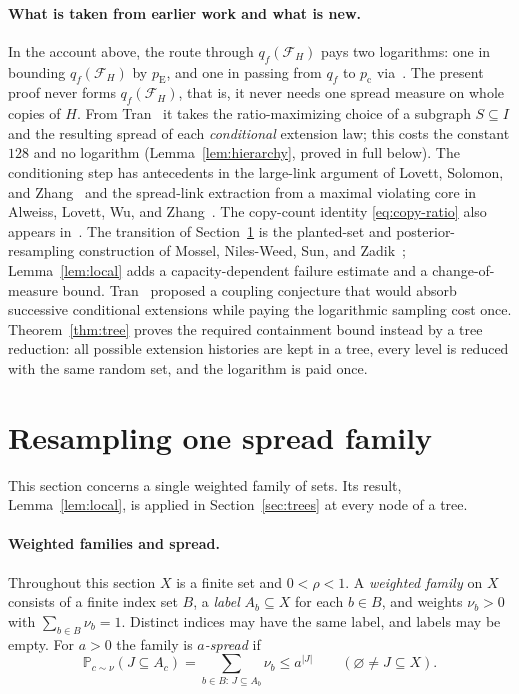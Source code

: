 \documentclass[11pt]{article}
\numberwithin{equation}{section}
\newcommand{\PP}{\mathbb P}
\newcommand{\pc}{p_{\mathrm c}}
\newcommand{\pE}{p_{\mathrm E}}
\begin{document}
\paragraph{What is taken from earlier work and what is new.}
In the account above, the route through $q_f(\mathcal F_H)$ pays two
logarithms: one in bounding $q_f(\mathcal F_H)$ by $\pE$, and one in
passing from $q_f$ to $\pc$ via~\cite{FKNP21}. The present proof never
forms $q_f(\mathcal F_H)$, that is, it never needs one spread measure on
whole copies of $H$. From Tran~\cite[Section~3, Lemma~3.1]{Tran26} it
takes the ratio-maximizing choice of a subgraph $S\subseteq I$ and the
resulting spread of each \emph{conditional} extension law; this costs
the constant $128$ and no logarithm (Lemma~\ref{lem:hierarchy}, proved
in full below). The conditioning step has antecedents in the large-link
argument of Lovett, Solomon, and Zhang~\cite[Claim~29]{LSZ19} and the
spread-link extraction from a maximal violating core in Alweiss, Lovett,
Wu, and Zhang~\cite[Lemma~2.4]{ALWZ21}. The copy-count identity
\eqref{eq:copy-ratio} also appears in~\cite[Equation~(5)]{MNSZ22}. The
transition of Section~\ref{sec:resampling} is the planted-set and
posterior-resampling construction of Mossel, Niles-Weed, Sun, and
Zadik~\cite[Sections~2.1--2.3]{MNSZ25}; Lemma~\ref{lem:local} adds a
capacity-dependent failure estimate and a change-of-measure bound.
Tran~\cite[Section~4]{Tran26} proposed a coupling conjecture that would
absorb successive conditional extensions while paying the logarithmic
sampling cost once. Theorem~\ref{thm:tree} proves the required
containment bound instead by a tree reduction: all possible extension
histories are kept in a tree, every level is reduced with the same
random set, and the logarithm is paid once.

\section{Resampling one spread family}\label{sec:resampling}

This section concerns a single weighted family of sets. Its result,
Lemma~\ref{lem:local}, is applied in Section~\ref{sec:trees} at every
node of a tree.

\paragraph{Weighted families and spread.}
Throughout this section $X$ is a finite set and $0<\rho<1$. A
\emph{weighted family} on $X$ consists of a finite index set $B$, a
\emph{label} $A_b\subseteq X$ for each $b\in B$, and weights $\nu_b>0$
with $\sum_{b\in B}\nu_b=1$. Distinct indices may have the same label,
and labels may be empty. For $a>0$ the family is \emph{$a$-spread} if
\begin{equation}\label{eq:spread}
 \PP_{c\sim\nu}(J\subseteq A_c)
 =\sum_{b\in B:\,J\subseteq A_b}\nu_b\le a^{|J|}
 \qquad(\varnothing\ne J\subseteq X).
\end{equation}
\end{document}
